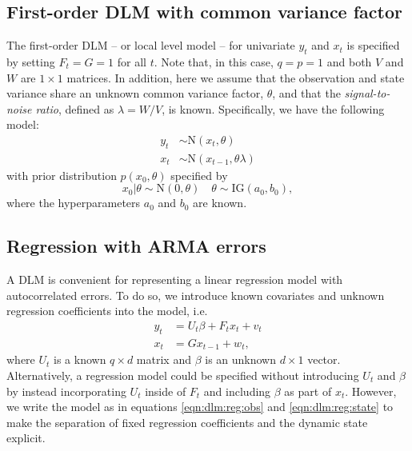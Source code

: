 \subsection{First-order DLM with common variance factor \label{sec:dlm:ll}}

The first-order DLM -- or local level model -- for univariate $y_t$ and $x_t$ is specified by setting $F_t = G = 1$ for all $t$. Note that, in this case, $q = p = 1$ and both $V$ and $W$ are $1 \times 1$ matrices. In addition, here we assume that the observation and state variance share an unknown common variance factor, $\theta$, and that the \emph{signal-to-noise ratio}, defined as $\lambda = W / V$, is known. Specifically, we have the following model:
\begin{align}
y_t &\sim \mbox{N}(x_t, \theta) \label{eqn:ll:obs} \\
x_t &\sim \mbox{N}(x_{t-1}, \theta\lambda) \label{eqn:ll:state}
\end{align}
with prior distribution $p(x_0, \theta)$ specified by
\begin{equation}
x_0|\theta \sim \mbox{N}(0, \theta) \quad \theta \sim \mbox{IG}(a_0,b_0), \label{eqn:ll:prior}
\end{equation}
where the hyperparameters $a_0$ and $b_0$ are known.

\subsection{Regression with ARMA errors \label{sec:dlm:arma}}

A DLM is convenient for representing a linear regression model with autocorrelated errors. To do so, we introduce known covariates and unknown regression coefficients into the model, i.e.
\begin{align}
y_t &= U_t\beta + F_tx_t + v_t \label{eqn:dlm:reg:obs} \\
x_t &= Gx_{t-1} + w_t, \label{eqn:dlm:reg:state}
\end{align}
where $U_t$ is a known $q \times d$ matrix and $\beta$ is an unknown $d \times 1$ vector. Alternatively, a regression model could be specified without introducing $U_t$ and $\beta$ by instead incorporating $U_t$ inside of $F_t$ and including $\beta$ as part of $x_t$. However, we write the model as in equations \eqref{eqn:dlm:reg:obs} and \eqref{eqn:dlm:reg:state} to make the separation of fixed regression coefficients and the dynamic state explicit.


